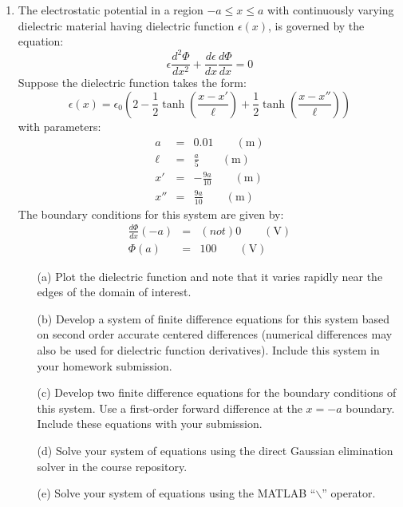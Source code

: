 \documentclass{article}
\begin{document}
\begin{enumerate}
  \item  The electrostatic potential in a region $-a \le x \le a$ with continuously varying dielectric material having dielectric function $\epsilon(x)$, is governed by the equation:  
  \begin{equation}
    \epsilon \frac{d^2 \Phi}{d x^2} + \frac{d \epsilon} {d x} \frac{d \Phi}{d x} = 0 
  \end{equation}
  Suppose the dielectric function takes the form:
  \begin{equation}
    \epsilon(x) = \epsilon_0 \left( 2 - \frac{1}{2} \tanh \left( \frac{x-x'}{\ell}\right) + \frac{1}{2} \tanh \left( \frac{x-x''}{\ell}\right) \right)
  \end{equation} 
  with parameters:
  \begin{eqnarray}
  a &=& 0.01 \qquad (\mathrm{m}) \nonumber \\
  \ell &=& \frac{a}{5} \qquad (\mathrm{m}) \nonumber \\
  x' &=& -\frac{9a}{10} \qquad (\mathrm{m}) \nonumber \\
  x'' &=& \frac{9a}{10} \qquad (\mathrm{m}) \nonumber  
  \end{eqnarray}  
  The boundary conditions for this system are given by:
  \begin{eqnarray}
  \frac{d \Phi}{d x}(-a) &=& (not) 0 \qquad (\mathrm{V}) \nonumber \\
  \Phi(a) &=& 100 \qquad (\mathrm{V}) \nonumber
  \end{eqnarray}     
  \begin{itemize}
    \item[(a)]  Plot the dielectric function and note that it varies rapidly near the edges of the domain of interest.
    \item[(b)]  Develop a system of finite difference equations for this system based on second order accurate centered differences (numerical differences may also be used for dielectric function derivatives).  Include this system in your homework submission.
    \item[(c)]  Develop two finite difference equations for the boundary conditions of this system.  Use a first-order forward difference at the $x=-a$ boundary.  Include these equations with your submission.  
    \item[(d)]  Solve your system of equations using the direct Gaussian elimination solver in the course repository.
    \item[(e)]  Solve your system of equations using the MATLAB ``$\backslash$'' operator.

\end{itemize}
\end{enumerate}
\end{document}
